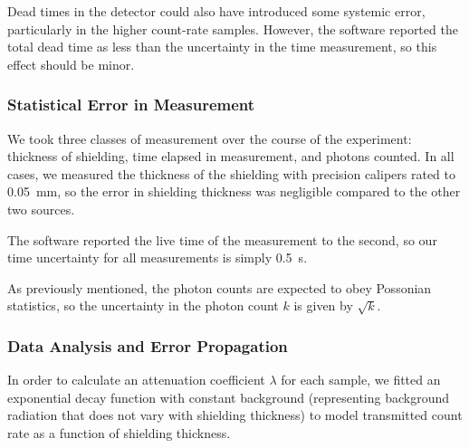 \documentclass[letter]{article}
\begin{document}
Dead times in the detector could also have introduced some systemic error, particularly in the higher count-rate samples. However, the software reported the total dead time as less than the uncertainty in the time measurement, so this effect should be minor.


\subsubsection{Statistical Error in Measurement}

We took three classes of measurement over the course of the experiment: thickness of shielding, time elapsed in measurement, and photons counted. In all cases, we measured the thickness of the shielding with precision calipers rated to \qty{0.05}{\mm}, so the error in shielding thickness was negligible compared to the other two sources.

The software reported the live time of the measurement to the second, so our time uncertainty for all measurements is simply \qty{0.5}{\s}.

As previously mentioned, the photon counts are expected to obey Possonian statistics, so the uncertainty in the photon count $k$ is given by $\sqrt{k}$. 

\subsubsection{Data Analysis and Error Propagation}

In order to calculate an attenuation coefficient $\lambda$ for each sample, we fitted an exponential decay function with constant background (representing background radiation that does not vary with shielding thickness) to model transmitted count rate as a function of shielding thickness.
\end{document}
